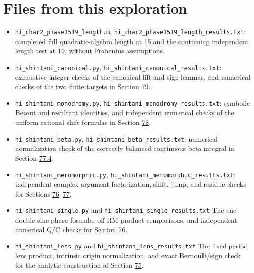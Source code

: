 \documentclass[11pt,reqno]{amsart}
\theoremstyle{plain}
\begin{document}
\section*{Files from this exploration}
\sloppy

\begin{itemize}
\item \texttt{hi\_\allowbreak char2\_\allowbreak phase1519\_\allowbreak length.m}, \texttt{hi\_\allowbreak char2\_\allowbreak phase1519\_\allowbreak length\_\allowbreak results.txt}:
completed full quadratic-algebra length at 15 and the continuing
independent length test at 19, without Frobenius assumptions.
\item \texttt{hi\_\allowbreak shintani\_\allowbreak canonical.py}, \texttt{hi\_\allowbreak shintani\_\allowbreak canonical\_\allowbreak results.txt}:
exhaustive integer checks of the canonical-lift and sign lemmas,
and numerical checks of the two finite targets in Section \hyperref[sec:79]{79}.
\item \texttt{hi\_\allowbreak shintani\_\allowbreak monodromy.py}, \texttt{hi\_\allowbreak shintani\_\allowbreak monodromy\_\allowbreak results.txt}:
symbolic Bezout and resultant identities, and independent numerical
checks of the uniform rational shift formulas in Section \hyperref[sec:78]{78}.
\item \texttt{hi\_\allowbreak shintani\_\allowbreak beta.py}, \texttt{hi\_\allowbreak shintani\_\allowbreak beta\_\allowbreak results.txt}: numerical
normalization check of the correctly balanced continuous beta integral
in Section \hyperref[sec:77.4]{77.4}.
\item \texttt{hi\_\allowbreak shintani\_\allowbreak meromorphic.py}, \texttt{hi\_\allowbreak shintani\_\allowbreak meromorphic\_\allowbreak results.txt}:
independent complex-argument factorization, shift, jump, and residue
checks for Sections \hyperref[sec:76]{76}--\hyperref[sec:77]{77}.
\item \texttt{hi\_\allowbreak shintani\_\allowbreak single.py} and \texttt{hi\_\allowbreak shintani\_\allowbreak single\_\allowbreak results.txt}
The one-double-sine phase formula, off-RM product comparisons, and
independent numerical Q/C checks for Section \hyperref[sec:76]{76}.
\item \texttt{hi\_\allowbreak shintani\_\allowbreak lens.py} and \texttt{hi\_\allowbreak shintani\_\allowbreak lens\_\allowbreak results.txt}
The fixed-period lens product, intrinsic origin normalization, and
exact Bernoulli/sign check for the analytic construction of Section \hyperref[sec:75]{75}.

\end{itemize}
\end{document}

